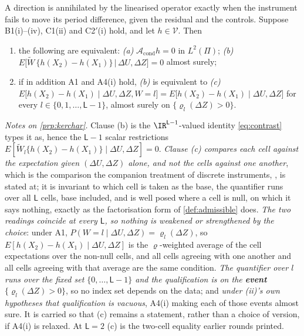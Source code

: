 \begin{proposition}\label{prp:kerchar}
A direction is annihilated by the linearised operator exactly when the instrument fails to move its
period difference, given the residual and the controls.
Suppose B1(i)--(iv), C1(ii) and C2$'$(i) hold, and let $h\in\mathcal V$. Then
\begin{enumerate}
\item[(i)] the following are equivalent:
\emph{(a)} $\mathcal A_{\mathrm{cond}}h=0$ in $L^{2}(\Pi)$;
\emph{(b)} $E\big[\widetilde W\,\{h(X_2)-h(X_1)\}\,\big|\,\Delta U,\Delta Z\big]=0$ almost surely;
\item[(ii)] if in addition A1 and A4(i) hold, \emph{(b)} is equivalent to
\emph{(c)} $E\big[h(X_2)-h(X_1)\mid\Delta U,\Delta Z,W=l\big]
=E\big[h(X_2)-h(X_1)\mid\Delta U,\Delta Z\big]$ for every $l\in\{0,1,\dots,\mathsf L-1\}$, almost
surely on $\{\varrho_l(\Delta Z)>0\}$.
\end{enumerate}
\end{proposition}

\noindent\emph{Notes on \cref{prp:kerchar}.} Clause \textup{(b)} is the $\IR^{\mathsf L-1}$-valued
identity \eqref{eq:contrast} types it as, hence the $\mathsf L-1$ scalar restrictions
$E[\widetilde W_l\{h(X_2)-h(X_1)\}\mid\Delta U,\Delta Z]=0$. \emph{Clause \textup{(c)} compares each cell
against the expectation given $(\Delta U,\Delta Z)$ alone, and not the cells against one another}, which
is the comparison the companion treatment of discrete instruments,
\citet{centorrinofeveflorens2019}, is stated at; it is invariant to which cell is taken as the
base, the quantifier runs over all $\mathsf L$ cells, base included, and is well posed where a cell
is null, on which it says nothing, exactly as the factorisation form of \cref{def:admissible} does.
\emph{The two readings coincide at every $\mathsf L$, so nothing is weakened or strengthened by the
choice}: under A1, $P(W=l\mid\Delta U,\Delta Z)=\varrho_l(\Delta Z)$, so
$E[h(X_2)-h(X_1)\mid\Delta U,\Delta Z]$ is the $\varrho$-weighted average of the cell expectations over
the non-null cells, and all cells agreeing with one another and all cells agreeing with that average are
the same condition. \emph{The quantifier over $l$ runs over the fixed set $\{0,\dots,\mathsf L-1\}$ and
the qualification is on the \textbf{event} $\{\varrho_l(\Delta Z)>0\}$}, so no index set depends on the
data; and \emph{under \textup{(ii)}'s own hypotheses that qualification is vacuous}, A4(i) making each
of those events almost sure. It is carried so that \textup{(c)} remains a statement, rather than a
choice of version, if A4(i) is relaxed.
At $\mathsf L=2$ \textup{(c)} is the two-cell equality earlier rounds printed.

